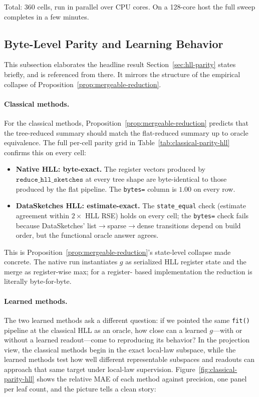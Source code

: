 Total: $360$ cells, run in parallel over CPU cores. On a 128-core host
the full sweep completes in a few minutes.

\subsection{Byte-Level Parity and Learning Behavior}\label{app:hll-empirical-collapse}

This subsection elaborates the headline result Section~\ref{sec:hll-parity}
states briefly, and is referenced from there. It mirrors the structure
of the empirical collapse of Proposition~\ref{prop:mergeable-reduction}.

\paragraph{Classical methods.}
For the classical methods, Proposition~\ref{prop:mergeable-reduction}
predicts that the tree-reduced summary should match the flat-reduced
summary up to oracle equivalence. The full per-cell parity grid in
Table~\ref{tab:classical-parity-hll} confirms this on every cell:

\begin{itemize}[leftmargin=1.5em]
    \item \textbf{Native HLL: byte-exact.} The register vectors
          produced by $\texttt{reduce\_hll\_sketches}$ at every tree
          shape are byte-identical to those produced by the flat
          pipeline. The \texttt{bytes=} column is $1.00$ on every row.
    \item \textbf{DataSketches HLL: estimate-exact.} The
          \texttt{state\_equal} check (estimate agreement within
          $2\times$ HLL RSE) holds on every cell; the \texttt{bytes=}
          check fails because DataSketches' list$\to$sparse$\to$dense
          transitions depend on build order, but the functional
          oracle answer agrees.
\end{itemize}

This is Proposition~\ref{prop:mergeable-reduction}'s state-level
collapse made concrete. The native run instantiates $g$ as serialized
HLL register state and the merge as register-wise max; for a register-
based implementation the reduction is literally byte-for-byte.

\paragraph{Learned methods.}
The two learned methods ask a different question: if we pointed the
same \texttt{fit()} pipeline at the classical HLL as an oracle, how
close can a learned $g$---with or without a learned readout---come to
reproducing its behavior? In the projection view, the classical
methods begin in the exact local-law subspace, while the learned
methods test how well different representable subspaces and readouts
can approach that same target under local-law supervision.
Figure~\ref{fig:classical-parity-hll} shows the relative MAE of each
method against precision, one panel per leaf count, and the picture
tells a clean story:

